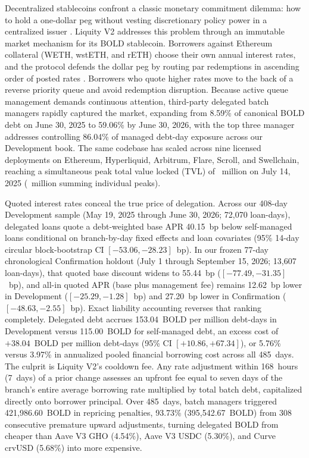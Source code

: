 Decentralized stablecoins confront a classic monetary commitment dilemma: how to hold a one-dollar peg without vesting discretionary policy power in a centralized issuer \citep{davernas2026can,ma2026stablecoin,goel2026making}. Liquity V2 addresses this problem through an immutable market mechanism for its BOLD stablecoin. Borrowers against Ethereum collateral (WETH, wstETH, and rETH) choose their own annual interest rates, and the protocol defends the dollar peg by routing par redemptions in ascending order of posted rates \citep{liquity2024whitepaper,liquity2024docs}. Borrowers who quote higher rates move to the back of a reverse priority queue and avoid redemption disruption. Because active queue management demands continuous attention, third-party delegated batch managers rapidly captured the market, expanding from 8.59\% of canonical BOLD debt on June 30, 2025 to 59.06\% by June 30, 2026, with the top three manager addresses controlling 86.04\% of managed debt-day exposure across our Development book. The same codebase has scaled across nine licensed deployments on Ethereum, Hyperliquid, Arbitrum, Flare, Scroll, and Swellchain, reaching a simultaneous peak total value locked (TVL) of ~million on July 14, 2025 (~million summing individual peaks).

Quoted interest rates conceal the true price of delegation. Across our 408-day Development sample (May 19, 2025 through June 30, 2026; 72,070 loan-days), delegated loans quote a debt-weighted base APR 40.15~bp below self-managed loans conditional on branch-by-day fixed effects and loan covariates (95\% 14-day circular block-bootstrap CI $[-53.06, -28.23]$~bp). In our frozen 77-day chronological Confirmation holdout (July 1 through September 15, 2026; 13,607 loan-days), that quoted base discount widens to 55.44~bp ($[-77.49, -31.35]$~bp), and all-in quoted APR (base plus management fee) remains 12.62~bp lower in Development ($[-25.29, -1.28]$~bp) and 27.20~bp lower in Confirmation ($[-48.63, -2.55]$~bp). Exact liability accounting reverses that ranking completely. Delegated debt accrues 153.04~BOLD per million debt-days in Development versus 115.00~BOLD for self-managed debt, an excess cost of $+38.04$~BOLD per million debt-days (95\% CI $[+10.86, +67.34]$), or 5.76\% versus 3.97\% in annualized pooled financial borrowing cost across all 485~days. The culprit is Liquity V2's cooldown fee. Any rate adjustment within 168~hours (7~days) of a prior change assesses an upfront fee equal to seven days of the branch's entire average borrowing rate multiplied by total batch debt, capitalized directly onto borrower principal. Over 485~days, batch managers triggered 421,986.60~BOLD in repricing penalties, 93.73\% (395,542.67~BOLD) from 308 consecutive premature upward adjustments, turning delegated BOLD from cheaper than Aave V3 GHO (4.54\%), Aave V3 USDC (5.30\%), and Curve crvUSD (5.68\%) into more expensive.

